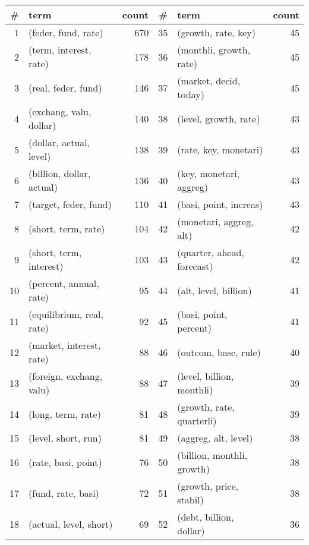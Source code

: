 \begin{tabular}{rlrrlr}
\toprule
  \# &                        term &  count &   \# &                          term &  count \\
\midrule
  1 &         (feder, fund, rate) &    670 &  35 &           (growth, rate, key) &     45 \\
  2 &      (term, interest, rate) &    178 &  36 &       (monthli, growth, rate) &     45 \\
  3 &         (real, feder, fund) &    146 &  37 &        (market, decid, today) &     45 \\
  4 &     (exchang, valu, dollar) &    140 &  38 &         (level, growth, rate) &     43 \\
  5 &     (dollar, actual, level) &    138 &  39 &         (rate, key, monetari) &     43 \\
  6 &   (billion, dollar, actual) &    136 &  40 &       (key, monetari, aggreg) &     43 \\
  7 &       (target, feder, fund) &    110 &  41 &        (basi, point, increas) &     43 \\
  8 &         (short, term, rate) &    104 &  42 &       (monetari, aggreg, alt) &     42 \\
  9 &     (short, term, interest) &    103 &  43 &    (quarter, ahead, forecast) &     42 \\
 10 &     (percent, annual, rate) &     95 &  44 &         (alt, level, billion) &     41 \\
 11 &   (equilibrium, real, rate) &     92 &  45 &        (basi, point, percent) &     41 \\
 12 &    (market, interest, rate) &     88 &  46 &          (outcom, base, rule) &     40 \\
 13 &    (foreign, exchang, valu) &     88 &  47 &     (level, billion, monthli) &     39 \\
 14 &          (long, term, rate) &     81 &  48 &     (growth, rate, quarterli) &     39 \\
 15 &         (level, short, run) &     81 &  49 &          (aggreg, alt, level) &     38 \\
 16 &         (rate, basi, point) &     76 &  50 &    (billion, monthli, growth) &     38 \\
 17 &          (fund, rate, basi) &     72 &  51 &       (growth, price, stabil) &     38 \\
 18 &      (actual, level, short) &     69 &  52 &       (debt, billion, dollar) &     36 \\

\end{tabular}
